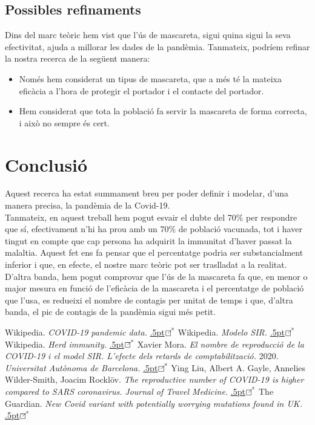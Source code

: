 \documentclass[a4paper, 11pt]{article}
\newcommand\en{\raise.5pt\hbox{$\boxempty\kern-4.85pt{}^{\nearrow}$}\kern-2pt}
\begin{document}
  \subsection{Possibles refinaments}
  Dins del marc teòric hem vist que l'ús de mascareta, sigui quina sigui la seva efectivitat, ajuda a millorar les dades de la pandèmia. Tanmateix, podríem refinar la nostra recerca de la següent manera:
  \begin{itemize}
    \item Només hem considerat un tipus de mascareta, que a més té la mateixa eficàcia a l'hora de protegir el portador i el contacte del portador.
    \item Hem considerat que tota la població fa servir la mascareta de forma correcta, i això no sempre és cert.
  \end{itemize}
\section{Conclusió}
  Aquest recerca ha estat summament breu per poder definir i modelar, d'una manera precisa, la pandèmia de la Covid-19.\\
  Tanmateix, en aquest treball hem pogut esvair el dubte del 70\% per respondre que sí, efectivament n'hi ha prou amb un 70\% de població vacunada, tot i haver tingut en compte que cap persona ha adquirit la immunitat d'haver passat la malaltia. Aquest fet ens fa pensar que el percentatge podria ser substancialment inferior i que, en efecte, el nostre marc teòric pot ser traslladat a la realitat.\\
  D'altra banda, hem pogut comprovar que l'ús de la mascareta fa que, en menor o major mesura en funció de l'eficàcia de la mascareta i el percentatge de població que l'usa, es redueixi el nombre de contagis per unitat de temps i que, d'altra banda, el pic de contagis de la pandèmia sigui més petit.
\begin{thebibliography}{99}
  Wikipedia. \textsl{COVID-19 pandemic data.} \href{https://en.wikipedia.org/wiki/Template:COVID-19_pandemic_data}{\en}
  Wikipedia. \textsl{Modelo SIR.} \href{https://es.wikipedia.org/wiki/Modelo_SIR}{\en}
  Wikipedia. \textsl{Herd immunity.} \href{https://en.wikipedia.org/wiki/Herd_immunity}{\en}
  Xavier Mora. \textsl{El nombre de reproducció de la COVID-19 i el model SIR. L'efecte dels retards de comptabilització.} 2020. \textit{Universitat Autònoma de Barcelona.} \href{https://mat.uab.cat/web/matmat/wp-content/uploads/sites/23/2020/06/v2020n02.pdf}{\en}
  Ying Liu, Albert A. Gayle, Annelies Wilder-Smith, Joacim Rocklöv. \textsl{The reproductive number of COVID-19 is higher compared to SARS coronavirus.} \textit{Journal of Travel Medicine.} \href{https://www.researchgate.net/publication/339272432_The_reproductive_number_of_COVID-19_is_higher_compared_to_SARS_coronavirus/fulltext/5e724347a6fdcc37caf4cf91/The-reproductive-number-of-COVID-19-is-higher-compared-to-SARS-coronavirus.pdf}{\en}
  The Guardian. \textsl{New Covid variant with potentially worrying mutations found in UK.} \href{https://www.theguardian.com/world/2021/feb/15/32-cases-of-latest-covid-variant-of-concern-found-in-uk}{\en}
\end{thebibliography}
\end{document}
